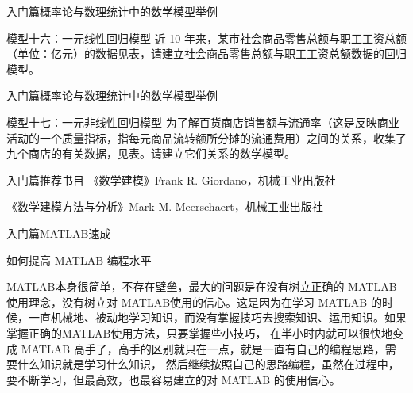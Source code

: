 \documentclass{beamer}
\begin{document}
\begin{frame}{入门篇}{概率论与数理统计中的数学模型举例}
\begin{block}{模型十六：一元线性回归模型}
近 10 年来，某市社会商品零售总额与职工工资总额（单位：亿元）的数据见表，请建立社会商品零售总额与职工工资总额数据的回归模型。

\begin{table}[h]
\centering
{}
\caption{数据}
\label{table1}
\end{table}

\end{block}
\end{frame}

\begin{frame}{入门篇}{概率论与数理统计中的数学模型举例}
\begin{block}{模型十七：一元非线性回归模型}
为了解百货商店销售额与流通率（这是反映商业活动的一个质量指标，指每元商品流转额所分摊的流通费用）之间的关系，收集了九个商店的有关数据，见表。请建立它们关系的数学模型。

\begin{table}[h]
\centering
{}
\caption{数据}
\label{table2}
\end{table}

\end{block}
\end{frame}

\begin{frame}{入门篇}{推荐书目}
《数学建模》Frank R. Giordano，机械工业出版社

《数学建模方法与分析》Mark M. Meerschaert，机械工业出版社

\end{frame}

\begin{frame}{入门篇}{MATLAB速成}
\begin{block}{如何提高 MATLAB 编程水平}

MATLAB本身很简单，不存在壁垒，最大的问题是在没有树立正确的 MATLAB 使用理念，没有树立对 MATLAB使用的信心。这是因为在学习 MATLAB 的时候，一直机械地、被动地学习知识，而没有掌握技巧去搜索知识、运用知识。如果掌握正确的MATLAB使用方法，只要掌握些小技巧， 在半小时内就可以很快地变成 MATLAB 高手了，高手的区别就只在一点，就是一直有自己的编程思路，需要什么知识就是学习什么知识， 然后继续按照自己的思路编程，虽然在过程中，要不断学习，但最高效，也最容易建立的对 MATLAB 的使用信心。
\end{block}
\end{frame}
\end{document}
